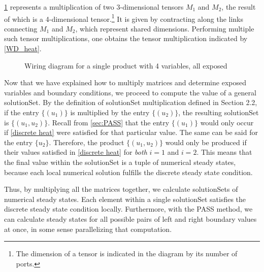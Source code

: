 \documentclass[11pt]{article}
\begin{document}
\cref{WD_oneproduct} represents a multiplication of two 3-dimensional tensors $M_1$ and $M_2$, the result of which is a 4-dimensional tensor.\footnote{The dimension of a tensor is indicated in the diagram by its number of ports.} It is given by contracting along the links connecting $M_1$ and $M_2$, which represent shared dimensions. Performing multiple such tensor multiplications, one obtains the tensor multiplication indicated by \cref{WD_heat}.


\begin{figure}
\caption{Wiring diagram for a single product with 4 variables, all exposed}
\label{WD_oneproduct}
\begin{center}
\end{center}
\end{figure}

Now that we have explained how to multiply matrices and determine exposed variables and boundary conditions, we proceed to compute the value of a general solutionSet.  By the definition of solutionSet multiplication defined in Section 2.2, if the entry $\{(u_1)\}$ is multiplied by the entry $\{(u_2)\}$, the resulting solutionSet is $\{(u_1, u_2)\}$. Recall from \cref{sec:PASS} that the entry $\{(u_1)\}$ would only occur if \cref{discrete heat} were satisfied for that particular value. The same can be said for the entry $\{u_2\}$. Therefore, the product $\{(u_1, u_2)\}$ would only be produced if their values satisfied in \cref{discrete heat} for \textit{both} $i = 1$ and $i = 2$. This means that the final value within the solutionSet is a tuple of numerical steady states, because each local numerical solution fulfills the discrete steady state condition.

Thus, by multiplying all the matrices together, we calculate solutionSets of numerical steady states. Each element within a single solutionSet satisfies the discrete steady state condition locally. Furthermore, with the PASS method, we can calculate steady states for all possible pairs of left and right boundary values at once, in some sense parallelizing that computation.
\end{document}
